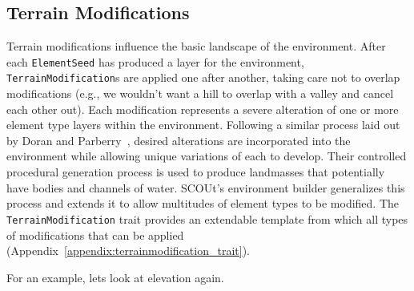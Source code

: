 \subsection{Terrain Modifications} \label{subsec:terrain_modifications}
Terrain modifications influence the basic landscape of the environment.
After each \texttt{ElementSeed} has produced a layer for the environment, \texttt{TerrainModification}s are applied one after another, taking care not to overlap modifications (e.g., we wouldn't want a hill to overlap with a valley and cancel each other out).
Each modification represents a severe alteration of one or more element type layers within the environment.
Following a similar process laid out by Doran and Parberry~\cite{doran_controlled_2010}, desired alterations are incorporated into the environment while allowing unique variations of each to develop.
Their controlled procedural generation process is used to produce landmasses that potentially have bodies and channels of water.
SCOUt's environment builder generalizes this process and extends it to allow multitudes of element types to be modified.
The \texttt{TerrainModification} trait provides an extendable template from which all types of modifications that can be applied (Appendix~\ref{appendix:terrainmodification_trait}).


\noindent
For an example, lets look at elevation again.


